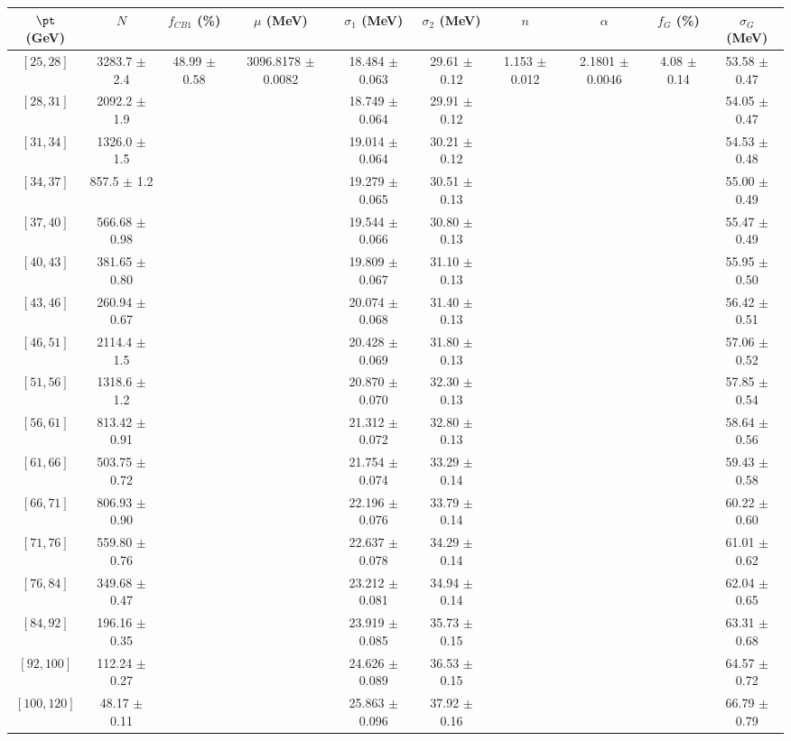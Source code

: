 \begin{tabular}{c||c|c|c|c|c|c|c|c|c}
$\pt$ (GeV) & $N$ & $f_{CB1}$ (\%)  & $\mu$ (MeV) & $\sigma_1$ (MeV) & $\sigma_2$ (MeV) & $n$ & $\alpha$ & $f_G$ (\%) & $\sigma_G$ (MeV) \\
\hline
$[25, 28]$ & 3283.7 $\pm$ 2.4 & \multirow{17}{*}{48.99 $\pm$ 0.58} & \multirow{17}{*}{3096.8178 $\pm$ 0.0082} & 18.484 $\pm$ 0.063 & 29.61 $\pm$ 0.12 & \multirow{17}{*}{1.153 $\pm$ 0.012} & \multirow{17}{*}{2.1801 $\pm$ 0.0046} & \multirow{17}{*}{4.08 $\pm$ 0.14} & 53.58 $\pm$ 0.47\\
$[28, 31]$ & 2092.2 $\pm$ 1.9 &  &  & 18.749 $\pm$ 0.064 & 29.91 $\pm$ 0.12 &  &  &  & 54.05 $\pm$ 0.47\\
$[31, 34]$ & 1326.0 $\pm$ 1.5 &  &  & 19.014 $\pm$ 0.064 & 30.21 $\pm$ 0.12 &  &  &  & 54.53 $\pm$ 0.48\\
$[34, 37]$ & 857.5 $\pm$ 1.2 &  &  & 19.279 $\pm$ 0.065 & 30.51 $\pm$ 0.13 &  &  &  & 55.00 $\pm$ 0.49\\
$[37, 40]$ & 566.68 $\pm$ 0.98 &  &  & 19.544 $\pm$ 0.066 & 30.80 $\pm$ 0.13 &  &  &  & 55.47 $\pm$ 0.49\\
$[40, 43]$ & 381.65 $\pm$ 0.80 &  &  & 19.809 $\pm$ 0.067 & 31.10 $\pm$ 0.13 &  &  &  & 55.95 $\pm$ 0.50\\
$[43, 46]$ & 260.94 $\pm$ 0.67 &  &  & 20.074 $\pm$ 0.068 & 31.40 $\pm$ 0.13 &  &  &  & 56.42 $\pm$ 0.51\\
$[46, 51]$ & 2114.4 $\pm$ 1.5 &  &  & 20.428 $\pm$ 0.069 & 31.80 $\pm$ 0.13 &  &  &  & 57.06 $\pm$ 0.52\\
$[51, 56]$ & 1318.6 $\pm$ 1.2 &  &  & 20.870 $\pm$ 0.070 & 32.30 $\pm$ 0.13 &  &  &  & 57.85 $\pm$ 0.54\\
$[56, 61]$ & 813.42 $\pm$ 0.91 &  &  & 21.312 $\pm$ 0.072 & 32.80 $\pm$ 0.13 &  &  &  & 58.64 $\pm$ 0.56\\
$[61, 66]$ & 503.75 $\pm$ 0.72 &  &  & 21.754 $\pm$ 0.074 & 33.29 $\pm$ 0.14 &  &  &  & 59.43 $\pm$ 0.58\\
$[66, 71]$ & 806.93 $\pm$ 0.90 &  &  & 22.196 $\pm$ 0.076 & 33.79 $\pm$ 0.14 &  &  &  & 60.22 $\pm$ 0.60\\
$[71, 76]$ & 559.80 $\pm$ 0.76 &  &  & 22.637 $\pm$ 0.078 & 34.29 $\pm$ 0.14 &  &  &  & 61.01 $\pm$ 0.62\\
$[76, 84]$ & 349.68 $\pm$ 0.47 &  &  & 23.212 $\pm$ 0.081 & 34.94 $\pm$ 0.14 &  &  &  & 62.04 $\pm$ 0.65\\
$[84, 92]$ & 196.16 $\pm$ 0.35 &  &  & 23.919 $\pm$ 0.085 & 35.73 $\pm$ 0.15 &  &  &  & 63.31 $\pm$ 0.68\\
$[92, 100]$ & 112.24 $\pm$ 0.27 &  &  & 24.626 $\pm$ 0.089 & 36.53 $\pm$ 0.15 &  &  &  & 64.57 $\pm$ 0.72\\
$[100, 120]$ & 48.17 $\pm$ 0.11 &  &  & 25.863 $\pm$ 0.096 & 37.92 $\pm$ 0.16 &  &  &  & 66.79 $\pm$ 0.79\\
\end{tabular}
